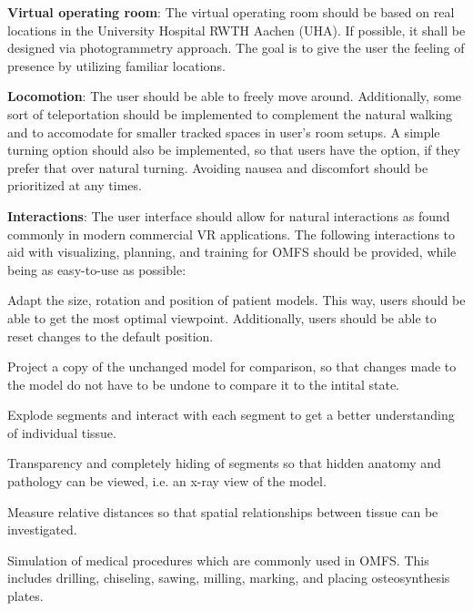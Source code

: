 \begin{compactenum}[label=(F \arabic*)]
    \item\label{req::F1} \textbf{Virtual operating room}: The virtual operating room should be based on real locations in the University Hospital RWTH Aachen (UHA).
    If possible, it shall be designed via photogrammetry approach. The goal is to give the user the feeling of presence by utilizing familiar locations.
    \item\label{req::F2} \textbf{Locomotion}: The user should be able to freely move around.
    Additionally, some sort of teleportation should be implemented to complement the natural walking and to accomodate for smaller tracked spaces in user's room setups.
    A simple turning option should also be implemented, so that users have the option, if they prefer that over natural turning.
    Avoiding nausea and discomfort should be prioritized at any times.
    \item\label{req::F3} \textbf{Interactions}: The user interface should allow for natural interactions as found commonly in modern commercial VR applications.
    The following interactions to aid with visualizing, planning, and training for OMFS should be provided, while being as easy-to-use as possible:
    \begin{compactenum}[label=(F 3.\arabic*)]
        \item \label{req::F3.1}Adapt the size, rotation and position of patient models.
        This way, users should be able to get the most optimal viewpoint.
        Additionally, users should be able to reset changes to the default position.
        \item \label{req::F3.2}Project a copy of the unchanged model for comparison, so that changes made to the model do not have to be undone to compare it to the intital state.
        \item \label{req::F3.3}Explode segments and interact with each segment to get a better understanding of individual tissue.
        \item \label{req::F3.4}Transparency and completely hiding of segments so that hidden anatomy and pathology can be viewed, i.e. an x-ray view of the model.
        \item \label{req::F3.5}Measure relative distances so that spatial relationships between tissue can be investigated.
        \item \label{req::F3.6}Simulation of medical procedures which are commonly used in OMFS.
        This includes drilling, chiseling, sawing, milling, marking, and placing osteosynthesis plates.

\end{compactenum}
\end{compactenum}
